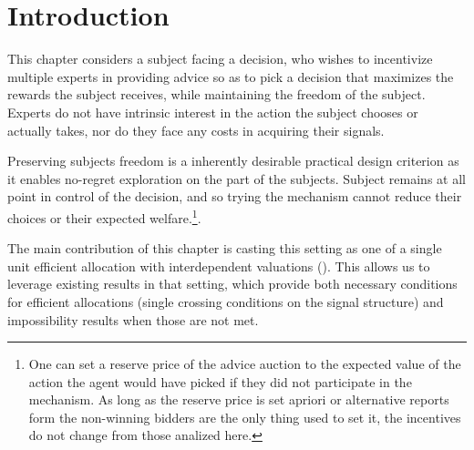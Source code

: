 
\section{Introduction}



This chapter considers a subject facing a decision, who wishes to incentivize multiple experts in providing advice so as to pick a decision that maximizes the rewards the subject receives, while maintaining the freedom of the subject.
Experts do not have intrinsic interest in the action the subject chooses or actually takes, nor do they face any costs in acquiring their signals.

Preserving subjects freedom is a inherently desirable practical design criterion as it enables no-regret exploration on the part of the subjects. Subject remains at all point in control of the decision, and so trying the mechanism cannot reduce their choices or their expected welfare.\footnote{One can set a reserve price of the advice auction to the expected value of the action the agent would have picked if they did not participate in the mechanism. As long as the reserve price is set apriori or alternative reports form the non-winning bidders are the only thing used to set it, the incentives do not change from those analized here.}.



The main contribution of this chapter is casting this setting as one of a single unit efficient allocation with interdependent valuations (\cite{milgrom1982theory,maskin1992auctions,ausubel1999generalized,mclean2004informational,roughgarden2016optimal,eden2018interdependent}).
This allows us to leverage existing results in that setting, which provide both necessary conditions for efficient allocations (single crossing conditions on the signal structure) and impossibility results when those are not met.


